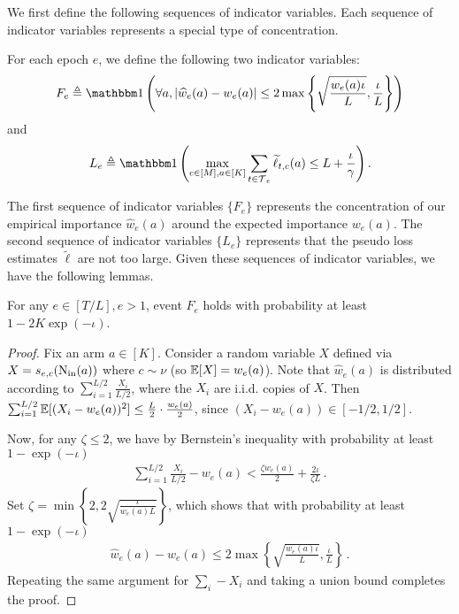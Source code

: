 We first define the following sequences of indicator variables. Each sequence of indicator variables represents a special type of concentration.

\begin{definition}
For each epoch $e$, we define the following two indicator variables:
\[F_e \triangleq \indi\left(\forall a,\left|\widehat{w}_e(a)-w_e(a)\right| \le 2 \max \left\{\sqrt{\frac{w_e(a) \iota}{L}}, \frac{\iota}{L}\right\}\right)\]
and 
\[L_e \triangleq \indi\left(\max _{c \in[M], a \in[K]} \sum_{t \in \Time_e} \widetilde{\ell}_{t,c}(a) \le L+\frac{\iota}{\gamma}\right).\]
\end{definition}

The first sequence of indicator variables $\{ F_e\}$ represents the concentration of our empirical importance $\widehat{w}_e(a)$ around the expected importance $w_e(a)$. The second sequence of indicator variables $\{ L_e\}$ represents that the pseudo loss estimates $\widetilde{\ell}$ are not too large. Given these sequences of indicator variables, we have the following lemmas.

\begin{lemma}
\label{lem: indicator_F}
    For any $e \in[T / L], e>1$, event $F_e$ holds with probability at least $1-2 K \exp (-\iota)$.
\end{lemma}
\begin{proof}
Fix an arm $a \in [K]$. Consider a random variable $X$ defined via $X = s_{e, c}(\operatorname{N_{\text{in}}}(a))$ where $c \sim \nu$ (so $\mathbb{E}[X] = w_{e}(a)$). Note that $\widehat{w}_{e}(a)$ is distributed according to $\sum_{i=1}^{L/2}\frac{X_i}{L/2}$, where the $X_i$ are i.i.d. copies of $X$. Then $\sum_{i=1}^{L/2}\mathbb{E}[(X_i-w_{e}(a))^2]\le \frac{L}{2}\cdot \frac{w_{e}(a)}{2}$, since $(X_i-w_{e}(a))\in[-1/2,1/2]$.

Now, for any $\zeta\le 2$, we have by Bernstein's inequality with probability at least $1-\exp(-\iota)$
\begin{align*}
    \sum_{i=1}^{L/2} \frac{X_i}{L/2} - w_{e}(a) < \frac{\zeta w_{e}(a)}{2}+\frac{2\iota}{\zeta L}\,. 
\end{align*}
Set $\zeta = \min\left\{2,2\sqrt{\frac{\iota}{w_{e}(a)L}}\right\}$, which shows that with probability at least $1-\exp(-\iota)$
\begin{align*}
    \widehat{w}_{e}(a)-w_{e}(a) \le 2\max\left\{\sqrt{\frac{w_{e}(a)\iota}{L}},\frac{\iota}{L}\right\}\,.
\end{align*}
Repeating the same argument for $\sum_i-X_i$ and taking a union bound completes the proof.
\end{proof}

